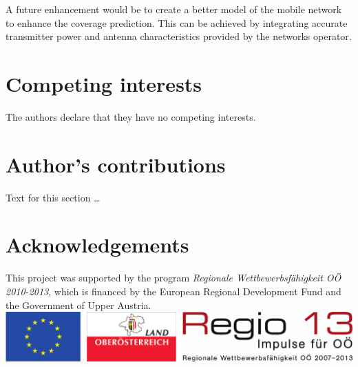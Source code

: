 \documentclass[twocolumn]{bmcart}%
\begin{document}
A future enhancement would be to create a better model of the mobile network to enhance the coverage prediction. This can be achieved by integrating accurate transmitter power and antenna characteristics provided by the networks operator.


\begin{backmatter}
	
	\section*{Competing interests}
	The authors declare that they have no competing interests.
	
	\section*{Author's contributions}
	Text for this section \ldots
	
	\section*{Acknowledgements}
	This project was supported by the program \emph{Regionale Wett\-be\-werbs\-f\"{a}\-higkeit O\"{O} 2010-2013}, which is financed by the European Regional Development Fund and the Government of Upper Austria.
	\includegraphics[width=\columnwidth]{Regio13.pdf}
	

\end{backmatter}
\end{document}
